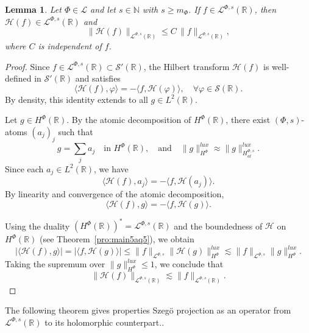 \documentclass[a4paper,12pt,intlimits,oneside]{amsart}
\newtheorem{lemme}[theorem]{Lemma}
\theoremstyle{definition}
\numberwithin{equation}{section}
\theoremstyle{definition}
\begin{document}
\begin{lemme}\label{pro:mainq5amaq}
Let $\Phi \in \mathscr{L}$ and let $s\in\mathbb{N}$ with $s\ge m_{\Phi}$. 
If $f \in \mathcal{L}^{\Phi,s}(\mathbb{R})$, then $\mathcal{H}(f)\in \mathcal{L}^{\Phi,s}(\mathbb{R})$ and
\begin{equation}\label{eq:deaqaa21}
\|\mathcal{H}(f)\|_{\mathcal{L}^{\Phi,s}(\mathbb{R})}
\leq C\,\|f\|_{\mathcal{L}^{\Phi,s}(\mathbb{R})},
\end{equation}
where $C$ is independent of $f$.
\end{lemme}

\begin{proof}
Since $f \in \mathcal{L}^{\Phi,s}(\mathbb{R}) \subset \mathscr{S}'(\mathbb{R})$, the Hilbert transform $\mathcal{H}(f)$ is well-defined in $\mathscr{S}'(\mathbb{R})$ and satisfies
\[
\langle \mathcal{H}(f), \varphi \rangle = -\langle f, \mathcal{H}(\varphi)\rangle,
\quad \forall \varphi \in \mathscr{S}(\mathbb{R}).
\]
By density, this identity extends to all $g \in L^2(\mathbb{R})$.

Let $g \in H^{\Phi}(\mathbb{R})$. By the atomic decomposition of $H^{\Phi}(\mathbb{R})$, there exist $(\Phi,s)$-atoms $(a_j)_j$ such that
\[
g = \sum_j a_j \quad \text{in } H^{\Phi}(\mathbb{R}),
\quad\text{and}\quad
\|g\|_{H^{\Phi}}^{lux} \approx \|g\|_{H^{\Phi,s}_{at}}^{lux}.
\]
Since each $a_j \in L^2(\mathbb{R})$, we have
\[
\langle \mathcal{H}(f), a_j \rangle = -\langle f, \mathcal{H}(a_j)\rangle.
\]
By linearity and convergence of the atomic decomposition,
\[
\langle \mathcal{H}(f), g \rangle = -\langle f, \mathcal{H}(g)\rangle.
\]

Using the duality $(H^{\Phi}(\mathbb{R}))^{*}=\mathcal{L}^{\Phi,s}(\mathbb{R})$ and the boundedness of $\mathcal{H}$ on $H^{\Phi}(\mathbb{R})$ (see Theorem~\ref{pro:main5aq5}), we obtain
\[
|\langle \mathcal{H}(f), g \rangle|
= |\langle f, \mathcal{H}(g)\rangle|
\leq \|f\|_{\mathcal{L}^{\Phi,s}}\|\mathcal{H}(g)\|_{H^{\Phi}}^{lux}
\lesssim \|f\|_{\mathcal{L}^{\Phi,s}}\|g\|_{H^{\Phi}}^{lux}.
\]
Taking the supremum over $\|g\|_{H^{\Phi}}^{lux}\le 1$, we conclude that
\[
\|\mathcal{H}(f)\|_{\mathcal{L}^{\Phi,s}(\mathbb{R})}
\lesssim \|f\|_{\mathcal{L}^{\Phi,s}(\mathbb{R})}.
\]
\end{proof}

\medskip
\noindent
The following theorem gives properties Szeg\"o projection as an operator from $\mathcal{L}^{\Phi,s}(\mathbb{R})$ to its holomorphic counterpart..
\end{document}
